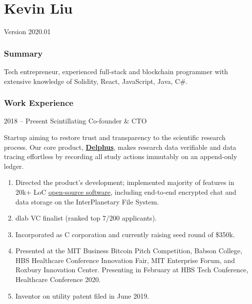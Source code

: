 \documentclass[paper=letter]{tccv}
\begin{document}
\part{Kevin Liu}


Version 2020.01

\section{Summary}

Tech entrepreneur, experienced full-stack and blockchain programmer with extensive knowledge of Solidity, React, JavaScript, Java, C\#.

\section{Work Experience}

\begin{eventlist}

\item{2018 -- Present}
     {Scintillating}
     {Co-founder \& CTO}

Startup aiming to restore trust and transparency to the scientific research process. Our core product, \href{https://delph.us}{\textbf{Delphus}}, makes research data verifiable and data tracing effortless by recording all study actions immutably on an append-only ledger.

\end{eventlist}

\vspace{-0.5cm}
\begin{enumerate}
     \item Directed the product's development; implemented majority of features in 20k+ LoC \href{https://gitlab.scintillating.us/scintillating/delphus}{open-source software}, including end-to-end encrypted chat and data storage on the InterPlanetary File System.
     \item dlab VC finalist (ranked top 7/200 applicants).
     \item Incorporated as C corporation and currently raising seed round of \$350k.
     \item Presented at the MIT Business Bitcoin Pitch Competition, Babson College, HBS Healthcare Conference Innovation Fair, MIT Enterprise Forum, and Roxbury Innovation Center. Presenting in February at HBS Tech Conference, Healthcare Conference 2020.
     \item Inventor on utility patent filed in June 2019.
\end{enumerate}
\end{document}
